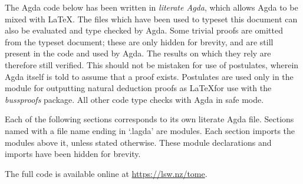 
The Agda code below has been written in \emph{literate Agda}, which allows Agda
to be mixed with \LaTeX. The files which have been used to typeset this document
can also be evaluated and type checked by Agda. Some trivial proofs are omitted
from the typeset document; these are only hidden for brevity, and are still
present in the code and used by Agda. The results on which they rely are
therefore still verified. This should not be mistaken for use of postulates,
wherein Agda itself is told to assume that a proof exists. Postulates are used
only in the module for outputting natural deduction proofs as \LaTeX for use
with the \emph{bussproofs} package. All other code type checks with Agda in safe
mode.

Each of the following sections corresponds to its own literate Agda file.
Sections named with a file name ending in `.lagda' are modules. Each section
imports the modules above it, unless stated otherwise. These module declarations
and imports have been hidden for brevity.

The full code is available online at \url{https://lsw.nz/tome}. 

